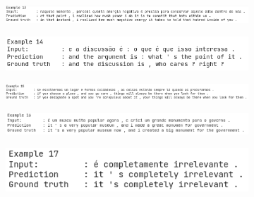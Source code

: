 \documentclass[12pt, a4paper]{book}
\begin{document}
\begin{figure}[h]
\begin{subfigure}{\linewidth}
\begin{flushright}
        \end{flushright}
    \end{subfigure}
    \break
    \begin{subfigure}{\linewidth}
        \begin{flushright}
        \includegraphics[width=\linewidth]{images/examples/14.png}
        \end{flushright}
    \end{subfigure}
    \break
    \begin{subfigure}{\linewidth}
        \begin{flushright}
        \includegraphics[width=\linewidth]{images/examples/15.png}
        \end{flushright}
    \end{subfigure}
    \break
    \begin{subfigure}{\linewidth}
        \begin{flushright}
        \includegraphics[width=\linewidth]{images/examples/16.png}
        \end{flushright}
    \end{subfigure}
    \break
    \begin{subfigure}{\linewidth}
        \begin{flushright}
        \includegraphics[width=\linewidth]{images/examples/17.png}
        \end{flushright}
    \end{subfigure}
    \break
    \begin{subfigure}{\linewidth}
        \begin{flushright}
        \includegraphics[width=\linewidth]{images/examples/18.png}

\end{flushright}
\end{subfigure}
\end{figure}
\end{document}
